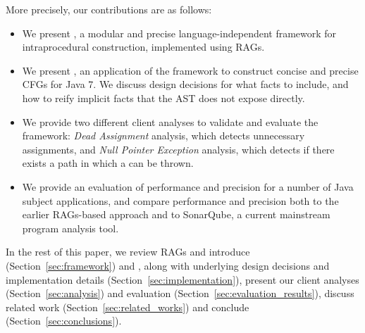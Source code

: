 More precisely, our contributions are as follows:
\begin{itemize}
\item We present \intracfg, a modular and precise language-independent framework
  for intraprocedural \CFG{} construction, implemented using RAGs.
\item We present \intraj, an application of the framework to construct concise and precise CFGs for Java 7.
  We discuss design decisions for what facts to include, and how to reify implicit facts that the AST does not expose directly.
\item We provide two different client analyses to validate and evaluate
  the framework: \emph{Dead Assignment} analysis, which detects unnecessary assignments,
  and \emph{Null Pointer Exception} analysis, which detects if there exists a path
  in which a  can be thrown.
\item We provide an evaluation of performance and precision for a number of Java subject applications, and compare performance and precision both to the earlier RAGs-based approach and to SonarQube, a current mainstream program analysis tool.
\end{itemize}




In the rest of this paper, we review RAGs and introduce {\intracfg} (Section~\ref{sec:framework}) and
{\intraj}, along with underlying design decisions and implementation details (Section~\ref{sec:implementation}), present our client analyses (Section~\ref{sec:analysis})
and evaluation (Section~\ref{sec:evaluation_results}), discuss related work
(Section~\ref{sec:related_works}) and conclude (Section~\ref{sec:conclusions}).










